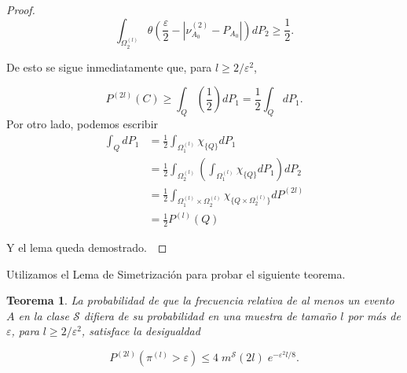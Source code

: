 \documentclass{report}
\newtheorem{thm}{Teorema}[section]
\begin{document}
\begin{proof}
\[
\int_{\Omega_2^{(l)}} \theta \left( \frac{\varepsilon}{2} - \left| \nu^{(2)}_{A_0} - P_{A_0} \right| \right) dP_2 \geq \frac{1}{2}.
\]

De esto se sigue inmediatamente que, para \( l \geq 2 / \varepsilon^2 \),

\[
P^{(2l)}(C) \geq \int_{Q} \left( \frac{1}{2} \right) dP_1  =
 \frac{1}{2} \int_{Q} dP_1.
\]
Por otro lado, podemos escribir
\begin{equation*}
 \begin{split}
   \int_{Q}dP_1 & = \frac{1}{2} \int_{\Omega_1^{(l)}} \chi_{\{Q\}}dP_1 \\
   &=\frac{1}{2}  \int_{\Omega_2^{(l)}}\left(\int_{\Omega_1^{(l)}} \chi_{\{Q\}}dP_1\right) dP_2 \\
   &=\frac{1}{2}  \int_{\Omega_1^{(l)}\times\Omega_2^{(l)}}  \chi_{\{Q\times \Omega_2^{(l)}\}} dP^{(2l)} \\
   &=\frac{1}{2}  P^{(l)}(Q)
\end{split}   
\end{equation*}

Y el lema queda demostrado.\



\end{proof}







Utilizamos el Lema de Simetrización para probar el siguiente teorema.\newline

\begin{thm}
    La probabilidad de que la frecuencia relativa de al menos un evento $A$ en la clase \( \mathcal{S} \) difiera de su probabilidad en una 
    muestra de tamaño \( l \) por más de \( \varepsilon \), para \( l \geq 2 / \varepsilon^2 \), satisface la desigualdad  

    \[
    P^{(2l)}\left(\pi^{(l)} > \varepsilon\right) \leq 4 \; m^{\mathcal{S}}(2l) \; e^{-\varepsilon^2 l/8}.
    \]  
\end{thm}
\end{document}
